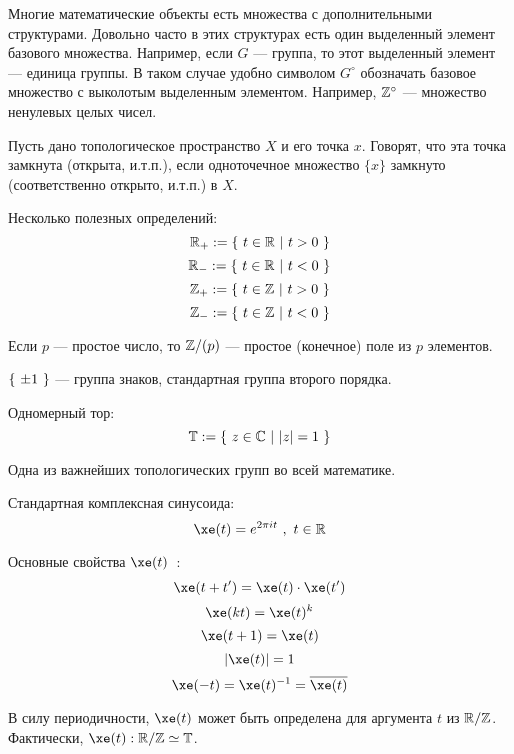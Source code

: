 




\SScover


\SSbullet

\SSsect Многие математические объекты есть множества с дополнительными структурами.
Довольно часто в этих структурах есть один выделенный элемент базового множества. 
Например, если \( G \) --- группа, то этот выделенный элемент --- единица группы. 
В таком случае удобно символом \( G^\circ \) обозначать базовое множество с выколотым выделенным элементом.
Например, \( \mathbb{Z}^\circ \) --- множество ненулевых целых чисел.

\SSsect Пусть дано топологическое пространство \( X \) и его точка \( x \). Говорят, что эта точка замкнута (открыта, и.т.п.), если одноточечное множество \( \{ x \} \) замкнуто (соответственно открыто, и.т.п.) в \( X \).

\SSsect Несколько полезных определений:
\[ \mathbb{R}_+ := \left\lbrace~  t \in \mathbb{R}  ~|~  t>0  ~\right\rbrace \]
\[ \mathbb{R}_- := \left\lbrace~  t \in \mathbb{R}  ~|~  t<0  ~\right\rbrace \]
\[ \mathbb{Z}_+ := \left\lbrace~  t \in \mathbb{Z}  ~|~  t>0  ~\right\rbrace \]
\[ \mathbb{Z}_- := \left\lbrace~  t \in \mathbb{Z}  ~|~  t<0  ~\right\rbrace \]

\SSsect Если \( p \) --- простое число, то \( \mathbb{Z}/(p) \) --- простое (конечное) поле из \( p \) элементов.

\SSsect \( \left\lbrace~\pm1~\right\rbrace \) --- группа знаков, стандартная группа второго порядка.

\SSsect Одномерный тор: 
\[ \mathbb{T} := \left\lbrace~  z \in \mathbb{C}  ~|~  |z|=1  ~\right\rbrace \]

Одна из важнейших топологических групп во всей математике.

\SSsect Стандартная комплексная синусоида:
\[ \xe(t) = e^{2 \pi i t} ~,~ t \in \xR \]

\SSsect Основные свойства \( \xe(t) \)~:
\[
\xe(t+t') = \xe(t) \cdot \xe(t')
\]
\[
\xe(kt) = \xe(t)^k
\]
\[
\xe(t+1) = \xe(t)
\]
\[
|\xe(t)| = 1
\]
\[
\xe(-t) = \xe(t)^{-1} = \overline{\xe(t)}
\]

\SSsect В силу периодичности, \( \xe(t) \) может быть определена для аргумента \( t \) из \( \mathbb{R}/\mathbb{Z} \). 
Фактически, \( \xe(t) : \xR/\xZ \simeq \xT \).


